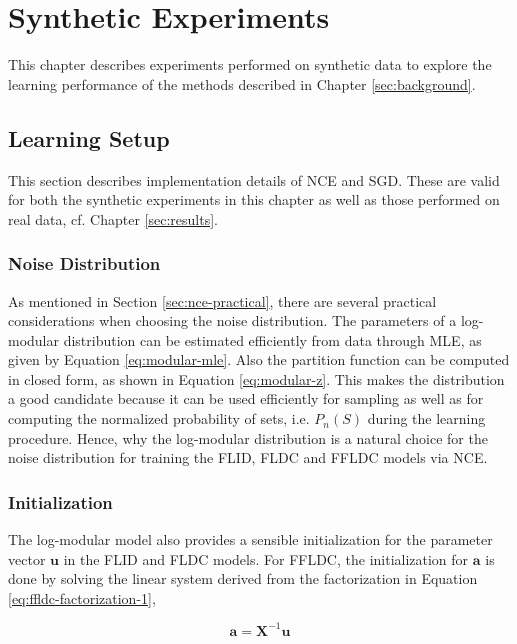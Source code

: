 \chapter{Synthetic Experiments}
\label{sec:synthetic}

This chapter describes experiments performed on synthetic data to explore the learning performance of the methods described in Chapter \ref{sec:background}.

\section{Learning Setup}

This section describes implementation details of NCE and SGD. These are valid for both the synthetic experiments in this chapter as well as those performed on real data, cf. Chapter \ref{sec:results}.

\subsection{Noise Distribution}

As mentioned in Section \ref{sec:nce-practical}, there are several practical considerations when choosing the noise distribution. The parameters of a log-modular distribution can be estimated efficiently from data through MLE, as given by Equation \eqref{eq:modular-mle}. Also the partition function can be computed in closed form, as shown in Equation \eqref{eq:modular-z}. This makes the distribution a good candidate because it can be used efficiently for sampling as well as for computing the normalized probability of sets, i.e. $P_{n}(S)$ during the learning procedure. Hence, why the log-modular distribution is a natural choice for the noise distribution for training the FLID, FLDC and FFLDC models via NCE.

\subsection{Initialization}

The log-modular model also provides a sensible initialization for the parameter vector $\mathbf{u}$ in the FLID and FLDC models. For FFLDC, the initialization for $\mathbf{a}$ is done by solving the linear system derived from the factorization in Equation \eqref{eq:ffldc-factorization-1},

\begin{equation}
  \label{eq:modular_features}
  \mathbf{a} = \mathbf{X}^{-1}\mathbf{u}
\end{equation}

